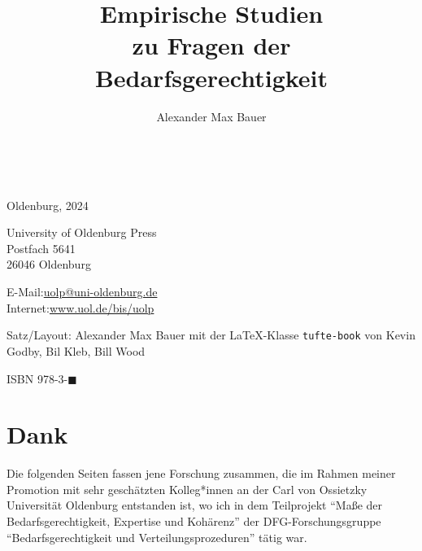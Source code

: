 \documentclass[justified,nobib,nohyper,symmetric,twoside]{tufte-book}
\title{Empirische Studien\\zu Fragen der\\Bedarfsgerechtigkeit}
\date{\empty}
\author{Alexander Max Bauer}
\begin{document}
\frontmatter

\maketitle


\newpage
\begin{fullwidth}
~\vfill
\thispagestyle{empty}
\setlength{\parindent}{0pt}
\setlength{\parskip}{\baselineskip}

\par Oldenburg, 2024

\par University of Oldenburg Press\\
Postfach 5641\\
26046 Oldenburg

\par E-Mail:\hspace{0.4cm}\href{mailto:uolp@uni-oldenburg.de}{uolp@uni-oldenburg.de}\\
Internet:\hspace{0.2cm}\href{www.uol.de/bis/uolp}{www.uol.de/bis/uolp}

\par Satz/Layout: Alexander Max Bauer mit der \LaTeX{}-Klasse \texttt{tufte-book} von Kevin Godby, Bil Kleb, Bill Wood

\par ISBN 978-3-$\blacksquare$

\end{fullwidth}


\tableofcontents



\chapter*{Dank}\label{ch:dank}
Die folgenden Seiten fassen jene Forschung zusammen, die im Rahmen meiner Promotion mit sehr geschätzten Kolleg*innen an der Carl von Ossietzky Universität Oldenburg entstanden ist, wo ich in dem Teilprojekt \enquote{Maße der Bedarfsgerechtigkeit, Expertise und Kohärenz} der DFG-Forschungsgruppe \enquote{Bedarfsgerechtigkeit und Verteilungsprozeduren} tätig war.
\end{document}

